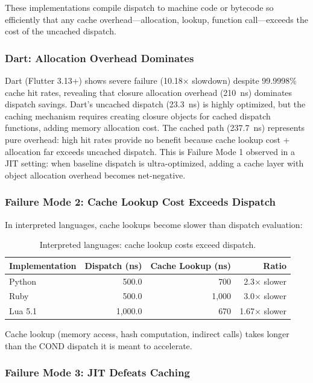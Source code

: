 \documentclass[sigplan,final]{acmart}
\begin{document}
These implementations compile dispatch to machine code or bytecode so efficiently that any
cache overhead—allocation, lookup, function call—exceeds the cost of the uncached dispatch.

\subsubsection{Dart: Allocation Overhead Dominates}

Dart (Flutter 3.13+) shows severe failure (10.18× slowdown) despite 99.9998\% cache hit rates,
revealing that closure allocation overhead (210~ns) dominates dispatch savings. Dart's uncached
dispatch (23.3~ns) is highly optimized, but the caching mechanism requires creating closure objects
for cached dispatch functions, adding memory allocation cost. The cached path (237.7~ns) represents
pure overhead: high hit rates provide no benefit because cache lookup cost + allocation far exceeds
uncached dispatch. This is Failure Mode 1 observed in a JIT setting: when baseline dispatch is
ultra-optimized, adding a cache layer with object allocation overhead becomes net-negative.

\subsubsection{Failure Mode 2: Cache Lookup Cost Exceeds Dispatch}

In interpreted languages, cache lookups become slower than dispatch evaluation:

\begin{table}[h]
\centering
\caption{Interpreted languages: cache lookup costs exceed dispatch.}
\label{tab:mode2}
\begin{tabular}{@{}lrrr@{}}
\toprule
\textbf{Implementation} & \textbf{Dispatch (ns)} & \textbf{Cache Lookup (ns)} & \textbf{Ratio} \\
\midrule
Python & 500.0 & 700 & 2.3× slower \\
Ruby & 500.0 & 1,000 & 3.0× slower \\
Lua 5.1 & 1,000.0 & 670 & 1.67× slower \\
\bottomrule
\end{tabular}
\end{table}

Cache lookup (memory access, hash computation, indirect calls) takes longer than the COND
dispatch it is meant to accelerate.

\subsubsection{Failure Mode 3: JIT Defeats Caching}
\end{document}
